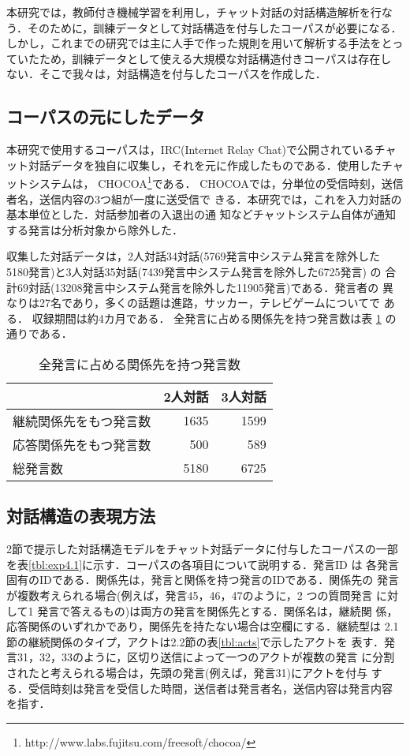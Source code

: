 本研究では，教師付き機械学習を利用し，チャット対話の対話構造解析を行な
う．そのために，訓練データとして対話構造を付与したコーパスが必要になる．
しかし，これまでの研究では主に人手で作った規則を用いて解析する手法をとっ
ていたため，訓練データとして使える大規模な対話構造付きコーパスは存在し
ない．そこで我々は，対話構造を付与したコーパスを作成した．

\subsection{コーパスの元にしたデータ}

本研究で使用するコーパスは，IRC(Internet Relay Chat)で公開されているチャ
ット対話データを独自に収集し，それを元に作成したものである．使用したチャ
ットシステムは， 
CHOCOA\footnote{http://www.labs.fujitsu.com/freesoft/chocoa/}である．
CHOCOAでは，分単位の受信時刻，送信者名，送信内容の3つ組が一度に送受信で
きる．本研究では，これを入力対話の基本単位とした．対話参加者の入退出の通
知などチャットシステム自体が通知する発言は分析対象から除外した．

収集した対話データは，2人対話34対話(5769発言中システム発言を除外した
5180発言)と3人対話35対話(7439発言中システム発言を除外した6725発言) の
合計69対話(13208発言中システム発言を除外した11905発言)である．発言者の
異なりは27名であり，多くの話題は進路，サッカー，テレビゲームについてで
ある． 収録期間は約4カ月である． 全発言に占める関係先を持つ発言数は表
\ref{tbl:relrate4.1} の通りである．


\begin{table}[tbt]
  \begin{center}
    \caption{全発言に占める関係先を持つ発言数}
    \label{tbl:relrate4.1}
    \begin{tabular}{|l|r|r|}
      \hline
      & 2人対話 & 3人対話 \\
      \hline
      継続関係先をもつ発言数 & 1635 & 1599\\\hline
      応答関係先をもつ発言数 & 500 & 589\\\hline
      総発言数 & 5180 & 6725\\
      \hline
    \end{tabular}
  \end{center}
\end{table}

\subsection{対話構造の表現方法} 

2節で提示した対話構造モデルをチャット対話データに付与したコーパスの一部
を表\ref{tbl:exp4.1}に示す．コーパスの各項目について説明する．発言ID は
各発言固有のIDである．関係先は，発言と関係を持つ発言のIDである．関係先の
発言が複数考えられる場合(例えば，発言45，46，47のように，2 つの質問発言
に対して1 発言で答えるもの)は両方の発言を関係先とする．関係名は，継続関
係，応答関係のいずれかであり，関係先を持たない場合は空欄にする．継続型は
2.1節の継続関係のタイプ，アクトは2.2節の表\ref{tbl:acts}で示したアクトを
表す．発言31，32，33のように，区切り送信によって一つのアクトが複数の発言
に分割されたと考えられる場合は，先頭の発言(例えば，発言31)にアクトを付与
する．受信時刻は発言を受信した時間，送信者は発言者名，送信内容は発言内容
を指す．

